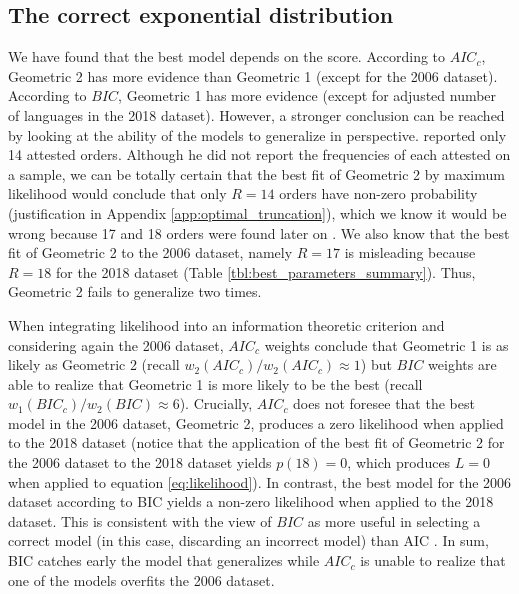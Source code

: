\documentclass[USenglish]{article}
\begin{document}
\subsection{The correct exponential distribution}

We have found that the best model depends on the score. According to $AIC_c$, Geometric 2 has more evidence than Geometric 1 (except for the 2006 dataset). According to $BIC$, Geometric 1 has more evidence (except for adjusted number of languages in the 2018 dataset). However, a stronger conclusion can be reached by looking at the ability of the models to generalize in perspective. 
\citet{Cinque2005a} reported only 14 attested orders. Although he did not report the frequencies of each attested on a sample, we can be totally certain that the best fit of Geometric 2 by maximum likelihood would conclude that only $R = 14$ orders have non-zero probability (justification in Appendix \ref{app:optimal_truncation}), which we know it would be wrong because 17 and 18 orders were found later on \citep{Dryer2006a,Dryer2018a}. We also know that the best fit of Geometric 2 to the 2006 dataset, namely $R = 17$ is misleading because $R=18$ for the 2018 dataset (Table \ref{tbl:best_parameters_summary}). Thus, Geometric 2 fails to generalize two times. 

When integrating likelihood into an information theoretic criterion and considering again the 2006 dataset, $AIC_c$ weights conclude that Geometric 1 is as likely as Geometric 2 (recall $w_2(AIC_c)/w_2(AIC_c) \approx 1$) but $BIC$ weights are able to realize that Geometric 1 is more likely to be the best (recall $w_1(BIC_c)/w_2(BIC) \approx 6$). Crucially, $AIC_c$ does not foresee that the best model in the 2006 dataset, Geometric 2, produces a zero likelihood when applied to the 2018 dataset (notice that the application of the best fit of Geometric 2 for the 2006 dataset to the 2018 dataset yields $p(18) = 0$, which produces $L = 0$ when applied to equation \ref{eq:likelihood}). In contrast, the best model for the 2006 dataset according to BIC yields a non-zero likelihood when applied to the 2018 dataset. This is consistent with the view of $BIC$ as more useful in selecting a correct model (in this case, discarding an incorrect model) than AIC \citep{Chakrabarti2011a}.
In sum, BIC catches early the model that generalizes while $AIC_c$ is unable to realize that one of the models overfits the 2006 dataset. 
\end{document}
